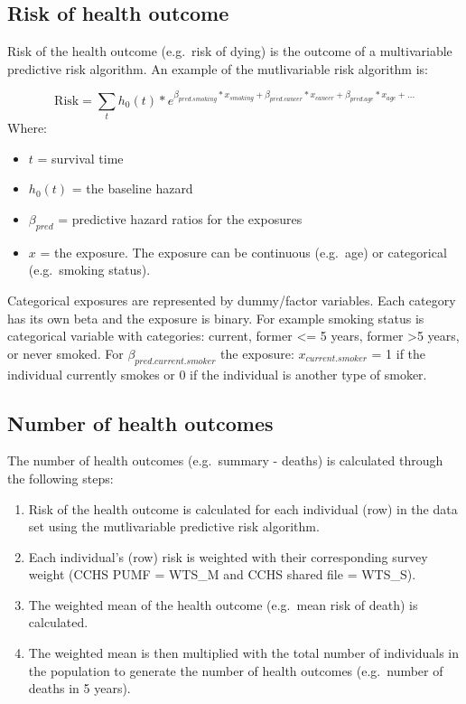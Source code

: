 \documentclass[]{book}
\providecommand{\tightlist}{%
  \setlength{\itemsep}{0pt}\setlength{\parskip}{0pt}}
\begin{document}
\subsection{Risk of health outcome}\label{risk-of-health-outcome}

Risk of the health outcome (e.g.~risk of dying) is the outcome of a
multivariable predictive risk algorithm. An example of the mutlivariable
risk algorithm is:

\[ \text{Risk} = \sum_t h_0(t) * e^{\beta_{pred.smoking}*x_{smoking}+\beta_{pred.cancer}*x_{cancer} + \beta_{pred.age}*x_{age} +...}  \]
Where:

\begin{itemize}
\tightlist
\item
  \(t\) = survival time
\item
  \(h_0(t)\) = the baseline hazard
\item
  \(\beta_{pred}\) = predictive hazard ratios for the exposures
\item
  \(x\) = the exposure. The exposure can be continuous (e.g.~age) or
  categorical (e.g.~smoking status).
\end{itemize}

Categorical exposures are represented by dummy/factor variables. Each
category has its own beta and the exposure is binary. For example
smoking status is categorical variable with categories: current, former
\textless{}= 5 years, former \textgreater{}5 years, or never smoked. For
\(\beta_{pred.current.smoker}\) the exposure: \(x_{current.smoker}\) = 1
if the individual currently smokes or 0 if the individual is another
type of smoker.

\subsection{Number of health outcomes}\label{number-of-health-outcomes}

The number of health outcomes (e.g.~summary - deaths) is calculated
through the following steps:

\begin{enumerate}
\def\labelenumi{\arabic{enumi}.}
\item
  Risk of the health outcome is calculated for each individual (row) in
  the data set using the mutlivariable predictive risk algorithm.
\item
  Each individual's (row) risk is weighted with their corresponding
  survey weight (CCHS PUMF = WTS\_M and CCHS shared file = WTS\_S).
\item
  The weighted mean of the health outcome (e.g.~mean risk of death) is
  calculated.
\item
  The weighted mean is then multiplied with the total number of
  individuals in the population to generate the number of health
  outcomes (e.g.~number of deaths in 5 years).
\end{enumerate}
\end{document}
